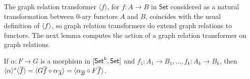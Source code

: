 \documentclass[runningheads]{llncs}
\newcommand{\set}{\mathsf{Set}}
\renewcommand{\id}{\mathit{id}}
\renewcommand{\id}{\mathit{id}}
\begin{document}
\begin{comment}
We also note that if $f : A \to B$ is a function seen as a natural
transformation between 0-ary functors, then $\graph{f}$ is (the 0-ary
relation transformer associated with) the graph relation of $f$.
Indeed, we need to apply Definition~\ref{definition:graph-nat-transf} with $k
= 0$, i.e., to the degenerate relation $\ast : \rel(\ast, \ast)$.  As
degenerate $0$-ary functors, $A$ and $B$ are constant functors, i.e.,
$A\, \ast = A$ and $B\, \ast = B$.  By the universal property of the
product, there exists a unique $h$ making the diagram
\[ \begin{tikzcd}[row sep = large]
        A
        &A
        \ar[l, equal]
        \ar[r, equal]
        \ar[d, dashed, "{h}"]
        &A
        \ar[r, "{f}"]
        &B \\
        &A \times B
        \ar[ul, "{\pi_1}"] \ar[urr, "{\pi_2}"']
\end{tikzcd}\]
commute. Since $\iota_\ast : \ast \to \ast$ is the identity on $\ast$,
and $A\, \id_{\ast} = \id_{A}$, we have $h_{\ast} = h$.  Moreover,
$h_{\overline{A \times B}} = \langle \id_{A}, f \rangle$ is a
monomorphism in $\set$ because $\id_{A}$ is.  Then,
$\iota_{f^\wedge\ast} = \langle \id_{A}, f \rangle$ and $f^\wedge\ast
= A$, from which we deduce that $\iota_{f^\wedge\ast} f^\wedge\ast =
\langle \id_{A}, f \rangle\, A = \graph{f}^*$. This ensures that the
graph of $f$ as a 0-ary natural transformation coincides with the
graph of $f$ as a morphism in $\set$, and so that
Definition~\ref{dfn:graph-nat-transf} is a reasonable generalization
of Definition~\ref{def:graph}.

Just as the equality relation $\Eq_B$ on a set $B$ coincides with
$\graph{\id_B}$, the graph of the identity on the set, so we can
define the equality relation transformer to be the graph of the
identity natural transformation. This gives

\begin{definition}
Let $F : [\set^k, \set]$.  The equality relation transformer on $F$ is
defined to be $\Eq_F = \graph{\id_{F}}$. This entails that $Eq_F = (F,
F, \Eq_F^*)$ with $\Eq_F^* = \graph{\id_{F}}^*$.
\end{definition}
\end{comment}

\noindent
The graph relation transformer $\langle f \rangle$, for $f : A \to B$
in $\set$ considered as a natural transformation between $0$-ary
functors $A$ and $B$, coincides with the usual definition of
$\langle {f} \rangle$, so graph relation transformers do extend graph relations
to functors.  The next lemma computes the action of a graph relation
transformer on graph relations.
\begin{lemma}\label{lem:eq-reln-equalities}
If $\alpha : F \to G$ is a morphism in $[\mathsf{Set}^k, \mathsf{Set}]$
and $f_1: A_1 \to B_1, ..., f_k : A_k \to B_k$,
then $\langle {\alpha} \rangle^* \langle {\overline{f}} \rangle
= \langle G \overline{f} \circ \alpha_{\overline{A}} \rangle
= \langle \alpha_{\overline{B}} \circ F \overline{f} \rangle$.
\end{lemma}
\end{document}
